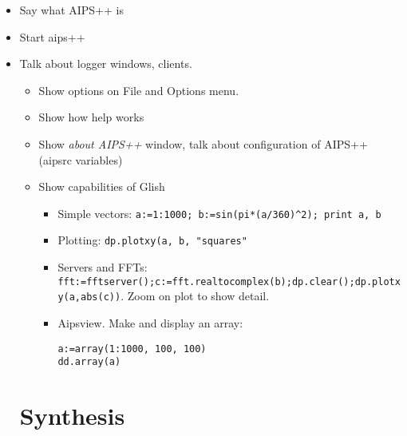\begin{itemize}
\item Say what AIPS++ is
\item Start aips++
\item Talk about logger windows, clients. 
\begin{itemize}
\item Show options on File and Options menu. 
\item Show how help works
\item Show {\em about AIPS++} window, talk about configuration of
AIPS++ (aipsrc variables)
\item Show capabilities of Glish
\begin{itemize}
\item Simple vectors: {\tt a:=1:1000; b:=sin(pi*(a/360)^2); print a, b}
\item Plotting: {\tt dp.plotxy(a, b, "squares"}
\item Servers and FFTs: {\tt
fft:=fftserver();c:=fft.realtocomplex(b);dp.clear();dp.plotxy(a,abs(c))}.
Zoom on plot to show detail.
\item Aipsview. Make and display an array:
\begin{verbatim}
a:=array(1:1000, 100, 100)
dd.array(a)
\end{verbatim}

\end{itemize}
\end{itemize}

\section{Synthesis}


\end{itemize}
